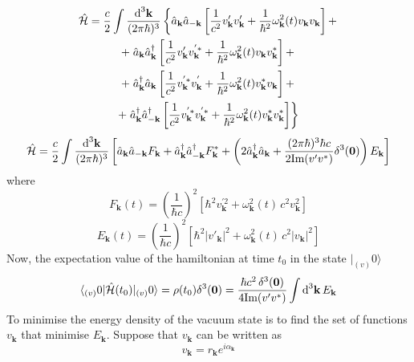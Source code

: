 \begin{multline}
	\hat{\mathcal{H}}=\frac{c}{2}\int\frac{\text{d}^3\mathbf{k}}{(2\pi\hbar)^3}\left\{\hat{a}_\mathbf{k}\hat{a}_{-\mathbf{k}}\left[\frac{1}{c^2}v'_\mathbf{k}v'_\mathbf{k}+\frac{1}{\hbar^2}\omega^2_\mathbf{k}(t)v_\mathbf{k}v_\mathbf{k}\right]+\right.\\
	+\left.\hat{a}_\mathbf{k}\hat{a}^\dagger_\mathbf{k}\left[\frac{1}{c^2}v'_\mathbf{k}v^{'*}_\mathbf{k}+\frac{1}{\hbar^2}\omega^2_\mathbf{k}(t)v_\mathbf{k}v^*_\mathbf{k}\right]+\right.\\
	+\left.\hat{a}^\dagger_\mathbf{k}\hat{a}_\mathbf{k}\left[\frac{1}{c^2}v^{'*}_\mathbf{k}v^{'}_\mathbf{k}+\frac{1}{\hbar^2}\omega^2_\mathbf{k}(t)v^*_\mathbf{k}v_\mathbf{k}\right]+\right.\\
	+\left.\hat{a}^\dagger_\mathbf{k}\hat{a}^\dagger_{-\mathbf{k}}\left[\frac{1}{c^2}v^{'*}_\mathbf{k}v^{'*}_\mathbf{k}+\frac{1}{\hbar^2}\omega^2_\mathbf{k}(t)v^*_\mathbf{k}v^*_\mathbf{k}\right]\right\}
\end{multline}
\begin{equation}
	\hat{\mathcal{H}}=\frac{c}{2}\int\frac{\text{d}^3\mathbf{k}}{(2\pi\hbar)^3}\left[\hat{a}_\mathbf{k}\hat{a}_{-\mathbf{k}}F_\mathbf{k}+\hat{a}^\dagger_\mathbf{k}\hat{a}^\dagger_{-\mathbf{k}}F_\mathbf{k}^*+\left(2\hat{a}_\mathbf{k}^\dagger\hat{a}_\mathbf{k}+\frac{(2\pi\hbar)^3\hbar c}{2\text{Im}(v'v^*)}\delta^3(\mathbf{0})\right)E_\mathbf{k}\right]
\end{equation}
where
\begin{equation}
	F_\mathbf{k}(t)=\left(\frac{1}{\hbar c}\right)^2\left[\hbar^2v^{'2}_\mathbf{k}+\omega^2_\mathbf{k}(t)\,c^2 v_\mathbf{k}^2\right]
\end{equation}
\begin{equation}
	E_\mathbf{k}(t)=\left(\frac{1}{\hbar c}\right)^2\left[\hbar^2\big|v'_\mathbf{k}\big|^2+\omega^2_\mathbf{k}(t)\,c^2 \big|v_\mathbf{k}\big|^2\right]
\end{equation}
Now, the expectation value of the hamiltonian at time $t_0$ in the state $|_{(v)}0\rangle$
\begin{equation}
	\langle_{(v)}0|\hat{\mathcal{H}}(t_0)|_{(v)}0\rangle=\rho(t_0)\delta^3(\mathbf{0})=\frac{\hbar c^2 \,\delta^3(\mathbf{0})}{4\text{Im}(v'v^*)}\int\text{d}^3\mathbf{k}\,E_\mathbf{k}
\end{equation}
To minimise the energy density of the vacuum state is to find the set of functions $v_\mathbf{k}$ that minimise $E_\mathbf{k}$. Suppose that $v_\mathbf{k}$ can be written as
\begin{equation}
	v_\mathbf{k}=r_\mathbf{k}e^{i\alpha_\mathbf{k}}
\end{equation}
